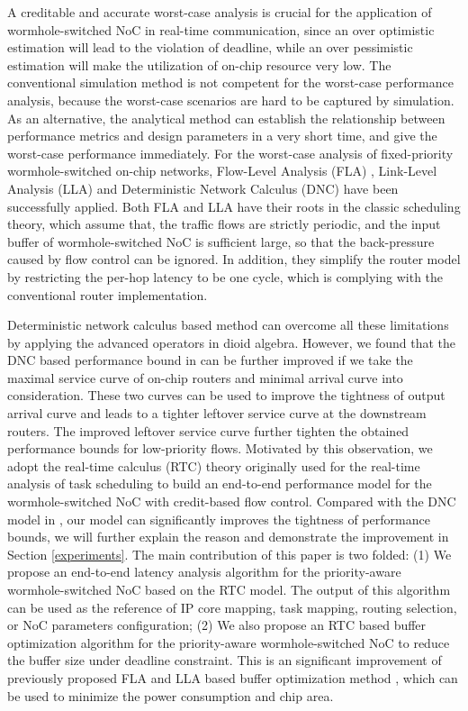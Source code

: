 \documentclass[10pt,journal]{IEEEtran}
\begin{document}
A creditable and accurate worst-case analysis is crucial for the application of wormhole-switched NoC in real-time communication, since an over optimistic estimation will lead to the violation of deadline, while an over pessimistic estimation will make the utilization of on-chip resource very low. The conventional simulation method is not competent for the worst-case performance analysis, because the worst-case scenarios are hard to be captured by simulation. As an alternative, the analytical method can establish the relationship between performance metrics and design parameters in a very short time, and give the worst-case performance immediately. For the worst-case analysis of fixed-priority wormhole-switched on-chip networks, Flow-Level Analysis (FLA) \cite{Shi:2008:RCA:1397757.1397996}, Link-Level Analysis (LLA) \cite{73}\cite{189} and Deterministic Network Calculus (DNC) \cite{Qian489900} have been successfully applied. Both FLA and LLA have their roots in the classic scheduling theory, which assume that, the traffic flows are strictly periodic, and the input buffer of wormhole-switched NoC is sufficient large, so that the back-pressure caused by flow control can be ignored. In addition, they simplify the router model by restricting the per-hop latency to be one cycle, which is complying with the conventional router implementation.

Deterministic network calculus based method \cite{Qian489900} can overcome all these limitations by applying the advanced operators in dioid algebra. However, we found that the DNC based performance bound in \cite{Qian489900} can be further improved if we take the maximal service curve of on-chip routers and minimal arrival curve into consideration. These two curves can be used to improve the tightness of output arrival curve and leads to a tighter leftover service curve at the downstream routers. The improved leftover service curve further tighten the obtained performance bounds for low-priority flows. Motivated by this observation, we adopt the real-time calculus (RTC) theory \cite{1253607} originally used for the real-time analysis of task scheduling to build an end-to-end performance model for the wormhole-switched NoC with credit-based flow control. Compared with the DNC model in \cite{Qian489900}, our model can significantly improves the tightness of performance bounds, we will further explain the reason and demonstrate the improvement in Section \ref{experiments}. The main contribution of this paper is two folded: (1) We propose an end-to-end latency analysis algorithm for the priority-aware wormhole-switched NoC based on the RTC model. The output of this algorithm can be used as the reference of IP core mapping, task mapping, routing selection, or NoC parameters configuration; (2) We also propose an RTC based buffer optimization algorithm for the priority-aware wormhole-switched NoC to reduce the buffer size under deadline constraint. This is an significant improvement of previously proposed FLA and LLA based buffer optimization method \cite{189}, which can be used to minimize the power consumption and chip area.
\end{document}
